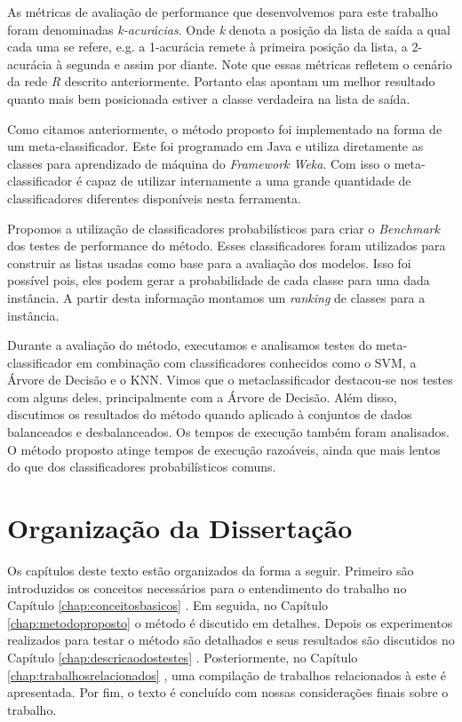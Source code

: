 As métricas de avaliação de performance que desenvolvemos para este trabalho foram denominadas \textit{k-acurácias}.
Onde \textit{k} denota a posição da lista de saída a qual cada uma se refere, e.g. a 1-acurácia remete à primeira posição da lista, a 2-acurácia à segunda e assim por diante.
Note que essas métricas refletem o cenário da rede \textit{R} descrito anteriormente.
Portanto elas apontam um melhor resultado quanto mais bem posicionada estiver a classe verdadeira na lista de saída.

Como citamos anteriormente, o método proposto foi implementado na forma de um meta-classificador.
Este foi programado em Java e utiliza diretamente as classes para aprendizado de máquina do \textit{Framework Weka}.
Com isso o meta-classificador é capaz de utilizar internamente a uma grande quantidade de classificadores diferentes disponíveis nesta ferramenta.

Propomos a utilização de classificadores probabilísticos para criar o \textit{Benchmark} dos testes de performance do método. 
Esses classificadores foram utilizados para construir as listas usadas como base para a avaliação dos modelos.
Isso foi possível pois, eles podem gerar a probabilidade de cada classe para uma dada instância.
A partir desta informação montamos um \textit{ranking} de classes para a instância.

Durante a avaliação do método, executamos e analisamos testes do meta-classificador em combinação com classificadores conhecidos como o SVM, a Árvore de Decisão e o KNN.
Vimos que o metaclassificador destacou-se nos testes com alguns deles, principalmente com a Árvore de Decisão.
Além disso, discutimos os resultados do método quando aplicado à conjuntos de dados balanceados e desbalanceados.
Os tempos de execução também foram analisados.
O método proposto atinge tempos de execução razoáveis, ainda que mais lentos do que dos classificadores probabilísticos comuns.

\section{Organização da Dissertação}

Os capítulos deste texto estão organizados da forma a seguir.
Primeiro são introduzidos os conceitos necessários para o entendimento do trabalho no Capítulo \ref{chap:conceitosbasicos} .
Em seguida, no Capítulo \ref{chap:metodoproposto}  o método é discutido em detalhes.
Depois os experimentos realizados para testar o método são detalhados e seus resultados são discutidos no Capítulo \ref{chap:descricaodostestes} .
Posteriormente, no Capítulo \ref{chap:trabalhosrelacionados} , uma compilação de trabalhos relacionados à este é apresentada.
Por fim, o texto é concluído com nossas considerações finais sobre o trabalho.
